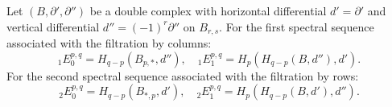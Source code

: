 Let $(B, \partial', \partial'')$ be a double complex with horizontal differential $d' = \partial'$ and vertical differential $d'' = (-1)^r \partial''$ on $B_{r,s}$. For the first spectral sequence associated with the filtration by columns:
$${}_1 E_0^{p,q} = H_{q-p}(B_{p,*}, d''), \quad {}_1 E_1^{p,q} = H_p(H_{q-p}(B, d''), d').$$
For the second spectral sequence associated with the filtration by rows:
$${}_2 E_0^{p,q} = H_{q-p}(B_{*,p}, d'), \quad {}_2 E_1^{p,q} = H_p(H_{q-p}(B, d'), d'').$$